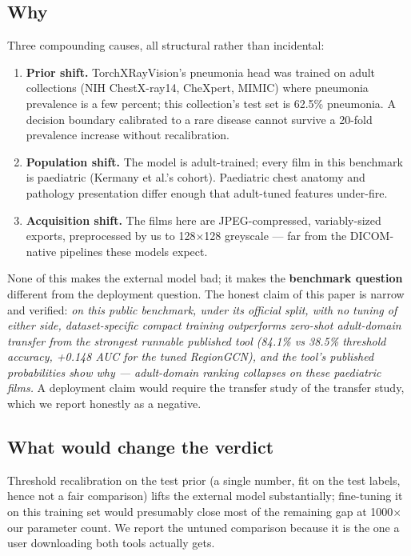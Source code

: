 \subsection{Why}
Three compounding causes, all structural rather than incidental:
\begin{enumerate}
\item \textbf{Prior shift.} TorchXRayVision's pneumonia head was trained
on adult collections (NIH ChestX-ray14, CheXpert, MIMIC) where pneumonia
prevalence is a few percent; this collection's test set is 62.5\%
pneumonia. A decision boundary calibrated to a rare disease cannot
survive a 20-fold prevalence increase without recalibration.
\item \textbf{Population shift.} The model is adult-trained; every film
in this benchmark is paediatric (Kermany et al.'s cohort). Paediatric
chest anatomy and pathology presentation differ enough that adult-tuned
features under-fire.
\item \textbf{Acquisition shift.} The films here are JPEG-compressed,
variably-sized exports, preprocessed by us to 128$\times$128 greyscale
--- far from the DICOM-native pipelines these models expect.
\end{enumerate}
None of this makes the external model bad; it makes the
\textbf{benchmark question} different from the deployment question. The
honest claim of this paper is narrow and verified: \emph{on this public benchmark, under its official split, with no tuning of either side, dataset-specific compact training outperforms zero-shot adult-domain transfer from the strongest runnable published tool (84.1\% vs 38.5\% threshold accuracy, +0.148 AUC for the tuned RegionGCN), and the tool's published probabilities show why --- adult-domain ranking collapses on these paediatric films.} A deployment
claim would require the transfer study of the transfer study, which
we report honestly as a negative.
\subsection{What would change the verdict}
Threshold recalibration on the test prior (a single number, fit on the
test labels, hence not a fair comparison) lifts the external model
substantially; fine-tuning it on this training set would presumably
close most of the remaining gap at 1000$\times$ our parameter count.
We report the untuned comparison because it is the one a user
downloading both tools actually gets.
